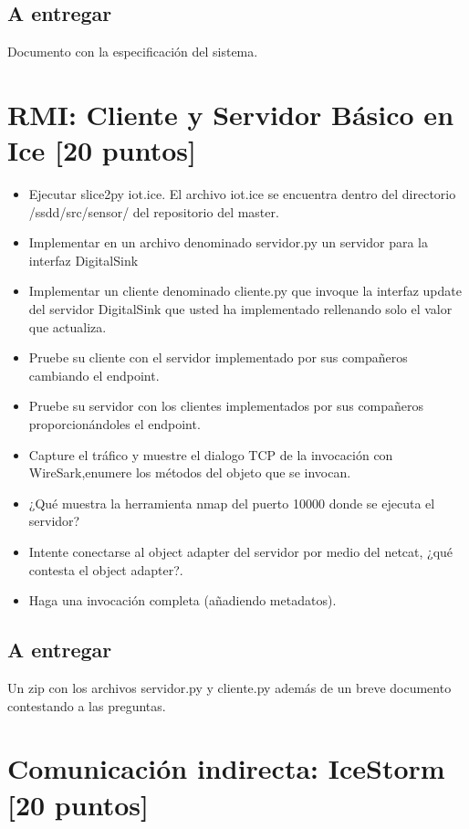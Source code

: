 \subsection{A entregar}

Documento con la especificación del sistema. 

\section{RMI: Cliente y Servidor Básico en Ice [20 puntos]}
\begin{itemize}
\item Ejecutar slice2py iot.ice. El archivo iot.ice se encuentra dentro del directorio /ssdd/src/sensor/ del repositorio del master.
\item Implementar en un archivo denominado servidor.py un servidor para la interfaz DigitalSink
\item Implementar un cliente denominado cliente.py que invoque la interfaz update del servidor DigitalSink que usted ha implementado rellenando solo el valor que actualiza.
\item Pruebe su cliente con el servidor implementado por sus compañeros cambiando el endpoint.
\item Pruebe su servidor con los clientes implementados por sus compañeros proporcionándoles el endpoint. 
\item Capture el tráfico y muestre el dialogo TCP de la invocación con WireSark,enumere los métodos del objeto que se invocan. 
\item ¿Qué muestra la herramienta nmap del puerto 10000 donde se ejecuta el servidor?
\item Intente conectarse al object adapter del servidor por medio del netcat, ¿qué contesta el object adapter?.
  \item Haga una invocación completa (añadiendo metadatos).
\end{itemize}

\subsection{A entregar}
Un zip con los archivos servidor.py y cliente.py además de un breve documento contestando a las preguntas.

\section{Comunicación indirecta: IceStorm [20 puntos]}

